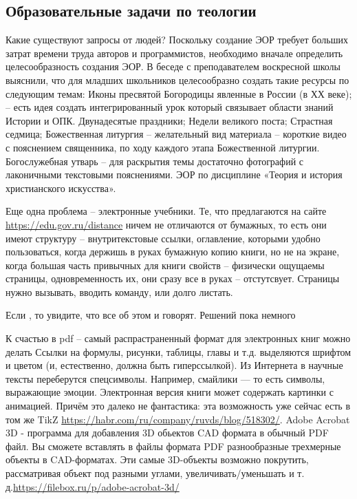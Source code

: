 \subsection{Образовательные задачи по теологии}

Какие существуют запросы от людей?
Поскольку создание ЭОР требует больших затрат времени труда авторов и программистов, необходимо вначале определить целесообразность создания ЭОР. В беседе с преподавателем воскресной школы выяснили, что для младших школьников целесообразно создать такие ресурсы по следующим темам:
Иконы пресвятой Богородицы явленные в России (в ХХ веке); – есть идея создать интегрированный урок который связывает области знаний Истории и ОПК.
Двунадесятые праздники;
Недели великого поста;
Страстная седмица;
Божественная литургия – желательный вид материала – короткие видео с пояснением священника, по ходу каждого этапа Божественной литургии.
Богослужебная утварь – для раскрытия темы достаточно фотографий с лаконичными текстовыми пояснениями.
ЭОР по дисциплине «Теория и история христианского искусства».

Еще одна проблема -- электронные учебники. Те, что предлагаются на сайте \url{https://edu.gov.ru/distance} ничем не отличаются от бумажных, то есть они имеют структуру -- внутритекстовые ссылки, оглавление, которыми удобно пользоваться, когда держишь в руках бумажную копию книги, но не на экране, когда большая часть привычных для книги свойств -- физически ощущаемы страницы, одновременность их, они сразу все в руках -- отстутсвует. Страницы нужно вызывать, вводить команду, или долго листать.

Если , то увидите, что все об этом и говорят. Решений пока немного

 К счастью в pdf -- самый распрастраненный формат для электронных книг можно делать Ссылки на формулы, рисунки, таблицы, главы и т.д. выделяются шрифтом и цветом (и, естественно, должна быть гиперссылкой). Из Интернета в научные тексты переберутся спецсимволы. Например, смайлики — то есть символы, выражающие эмоции. Электронная версия книги может содержать картинки с анимацией. Причём это далеко не фантастика: эта возможность уже сейчас есть в том же TikZ \url{https://habr.com/ru/company/ruvds/blog/518302/}. Adobe Acrobat 3D - программа для добавления 3D обьектов CAD формата в обычный PDF файл. Вы сможете вставлять в файлы формата PDF разнообразные трехмерные объекты в CAD-форматах. Эти самые 3D-объекты возможно покрутить, рассматривая объект под разными углами, увеличивать/уменьшать и т. д.\url{https://filebox.ru/p/adobe-acrobat-3d/}

